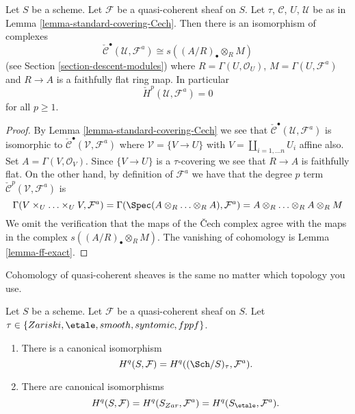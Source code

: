 \begin{lemma}
\label{lemma-standard-covering-Cech-quasi-coherent}
Let $S$ be a scheme. Let $\mathcal{F}$ be a quasi-coherent sheaf on $S$.
Let $\tau$, $\mathcal{C}$, $U$, $\mathcal{U}$ be as in
Lemma \ref{lemma-standard-covering-Cech}. Then there is an isomorphism
of complexes
$$
\check{\mathcal{C}}^\bullet(\mathcal{U}, \mathcal{F}^a)
\cong
s((A/R)_\bullet \otimes_R M)
$$
(see Section \ref{section-descent-modules})
where $R = \Gamma(U, \mathcal{O}_U)$, $M = \Gamma(U, \mathcal{F}^a)$
and $R \to A$ is a faithfully flat ring map. In particular
$$
\check{H}^p(\mathcal{U}, \mathcal{F}^a) = 0
$$
for all $p \geq 1$.
\end{lemma}

\begin{proof}
By Lemma \ref{lemma-standard-covering-Cech} we see that
$\check{\mathcal{C}}^\bullet(\mathcal{U}, \mathcal{F}^a)$
is isomorphic to $\check{\mathcal{C}}^\bullet(\mathcal{V}, \mathcal{F}^a)$
where $\mathcal{V} = \{V \to U\}$ with $V = \coprod_{i = 1, \ldots n} U_i$
affine also. Set $A = \Gamma(V, \mathcal{O}_V)$. Since $\{V \to U\}$
is a $\tau$-covering we see that $R \to A$ is faithfully flat.
On the other hand, by definition of $\mathcal{F}^a$ we have
that the degree $p$ term $\check{\mathcal{C}}^p(\mathcal{V}, \mathcal{F}^a)$
is
$$
\Gamma(V \times_U \ldots \times_U V, \mathcal{F}^a)
=
\Gamma(\Spec(A \otimes_R \ldots \otimes_R A), \mathcal{F}^a)
=
A \otimes_R \ldots \otimes_R A \otimes_R M
$$
We omit the verification that the maps of the {\v C}ech complex agree with
the maps in the complex $s((A/R)_\bullet \otimes_R M)$. The vanishing
of cohomology is Lemma \ref{lemma-ff-exact}.
\end{proof}

\begin{proposition}
\label{proposition-same-cohomology-quasi-coherent}
\begin{slogan}
Cohomology of quasi-coherent sheaves is the same no matter which
topology you use.
\end{slogan}
Let $S$ be a scheme. Let $\mathcal{F}$ be a quasi-coherent sheaf on $S$.
Let $\tau \in \{Zariski, \linebreak[0] \etale, \linebreak[0]
smooth, \linebreak[0] syntomic, \linebreak[0] fppf\}$.
\begin{enumerate}
\item There is a canonical isomorphism
$$
H^q(S, \mathcal{F}) = H^q((\Sch/S)_\tau, \mathcal{F}^a).
$$
\item There are canonical isomorphisms
$$
H^q(S, \mathcal{F}) =
H^q(S_{Zar}, \mathcal{F}^a) =
H^q(S_\etale, \mathcal{F}^a).
$$
\end{enumerate}
\end{proposition}

